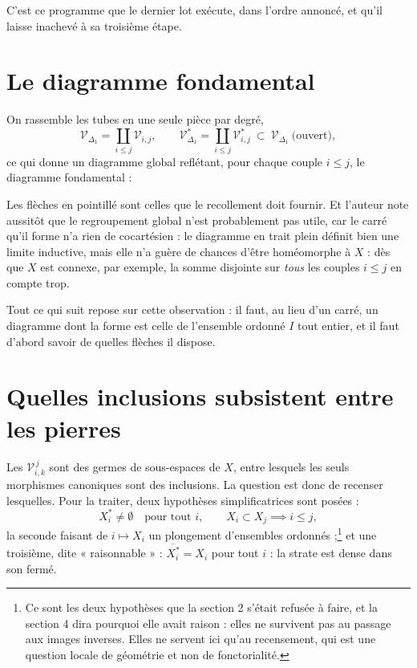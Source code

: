 \documentclass[11pt,a4paper]{article}
\begin{document}
C'est ce programme que le dernier lot exécute, dans l'ordre annoncé, et qu'il
laisse inachevé à sa troisième étape.

\section*{Le diagramme fondamental}

On rassemble les tubes en une seule pièce par degré,
\[
  \mathcal{V}_{\Delta_{1}} = \coprod_{i \leq j} \mathcal{V}_{i,j},
  \qquad
  \mathcal{V}^{*}_{\Delta_{1}} = \coprod_{i \leq j} \mathcal{V}^{*}_{i,j}
  \ \subset \ \mathcal{V}_{\Delta_{1}} \ \text{(ouvert)},
\]
ce qui donne un diagramme global reflétant, pour chaque couple $i \leq j$, le
diagramme fondamental :


Les flèches en pointillé sont celles que le recollement doit fournir. Et
l'auteur note aussitôt que le regroupement global n'est probablement pas utile,
car le carré qu'il forme n'a rien de cocartésien : le diagramme en trait plein
définit bien une limite inductive, mais elle n'a guère de chances d'être
homéomorphe à $X$ : dès que $X$ est connexe, par exemple, la somme disjointe sur
\emph{tous} les couples $i \leq j$ en compte trop.

Tout ce qui suit repose sur cette observation : il faut, au lieu d'un carré,
un diagramme dont la forme est celle de l'ensemble ordonné $I$ tout
entier, et il faut d'abord savoir de quelles flèches il dispose.

\section*{Quelles inclusions subsistent entre les pierres}

Les $\mathcal{V}^{\,j}_{i,k}$ sont des germes de sous-espaces de $X$, entre
lesquels les seuls morphismes canoniques sont des inclusions. La question est
donc de recenser lesquelles. Pour la traiter, deux hypothèses simplificatrices
sont posées :
\[
  X_{i}^{*} \neq \emptyset \quad \text{pour tout } i,
  \qquad X_{i} \subset X_{j} \implies i \leq j,
\]
la seconde faisant de $i \mapsto X_{i}$ un plongement d'ensembles
ordonnés ;\footnote{Ce sont les deux hypothèses que la section 2
s'était refusée à faire, et la section 4 dira pourquoi elle avait raison : elles
ne survivent pas au passage aux images inverses. Elles ne servent ici qu'au
recensement, qui est une question locale de géométrie et non de fonctorialité.}
et une troisième, dite « raisonnable » :
$\overline{X_{i}^{*}} = X_{i}$ pour tout $i$ : la strate est dense dans son
fermé.
\end{document}
